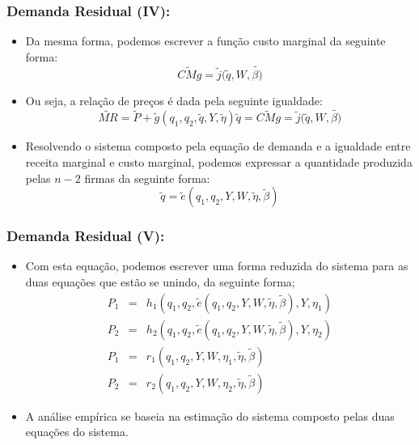 \documentclass{beamer}
\begin{document}
\begin{frame}\frametitle{Demanda Residual (IV):}

\begin{itemize}
\item Da mesma forma, podemos escrever a função custo marginal da seguinte
forma:
\[
\tilde{CMg}=\tilde{j}(\tilde{q},W,\tilde{\beta)}
\]

\item Ou seja, a relação de preços é dada pela seguinte igualdade:
\[
\tilde{MR}=\tilde{P}+\tilde{g}(q_{1},q_{2},\tilde{q},Y,\tilde{\eta})\tilde{q}=\tilde{CMg}=\tilde{j}(\tilde{q},W,\tilde{\beta)}
\]

\item Resolvendo o sistema composto pela equação de demanda e a igualdade
entre receita marginal e custo marginal, podemos expressar a quantidade
produzida pelas $n-2$ firmas da seguinte forma:
\[
\tilde{q}=\tilde{e}(q_{1},q_{2},Y,W,\tilde{\eta},\tilde{\beta})
\]

\end{itemize}
\end{frame}

\begin{frame}\frametitle{Demanda Residual (V):}

\begin{itemize}
\item Com esta equação, podemos escrever uma forma reduzida do sistema para
as duas equações que estão se unindo, da seguinte forma;
\begin{eqnarray*}
P_{1} & = & h_{1}(q_{1},q_{2},\tilde{e}(q_{1},q_{2},Y,W,\tilde{\eta},\tilde{\beta}),Y,\eta_{1})\\
P_{2} & = & h_{2}(q_{1},q_{2},\tilde{e}(q_{1},q_{2},Y,W,\tilde{\eta},\tilde{\beta}),Y,\eta_{2})\\
P_{1} & = & r_{1}(q_{1},q_{2},Y,W,\eta_{1},\tilde{\eta},\tilde{\beta})\\
P_{2} & = & r_{2}(q_{1},q_{2},Y,W,\eta_{2},\tilde{\eta},\tilde{\beta})
\end{eqnarray*}

\item A análise empírica se baseia na estimação do sistema composto pelas
duas equações do sistema. 
\end{itemize}
\end{frame}


\begin{frame}[allowframebreaks]



\end{frame}

\end{document}
